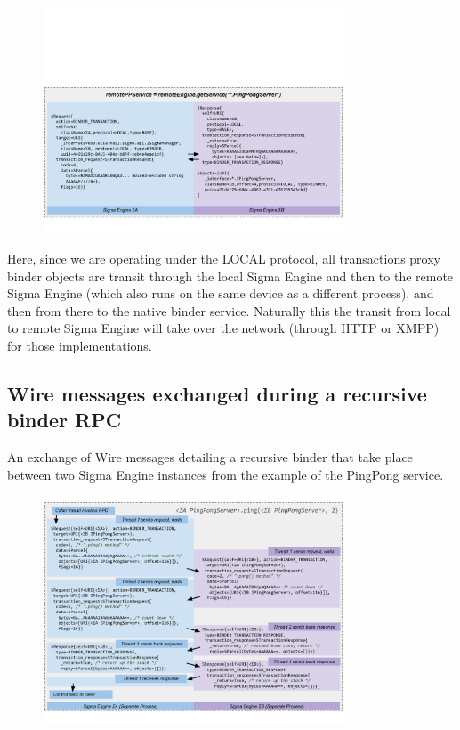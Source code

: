 \documentclass[prodmode]{acmlarge}
\begin{document}
\begin{figure}[h!]
\centering
\includegraphics[width=0.8\textwidth]{drawings/WireExchange2.pdf}
\end{figure}

Here, since we are operating under the LOCAL protocol, all transactions proxy binder objects are transit through the local Sigma Engine and then to the remote Sigma Engine (which also runs on the same device as a different process), and then from there to the native binder service. Naturally this the transit from local to remote Sigma Engine will take over the network (through HTTP or XMPP) for those implementations.

\pagebreak[4]
\subsection{Wire messages exchanged during a recursive binder RPC}
\label{app:WireExchangeRecursive}
An exchange of Wire messages detailing a recursive binder that take place between two Sigma Engine instances from the example of the PingPong service.
\begin{figure}[h!]
\centering
\includegraphics[width=0.8\textwidth]{drawings/WireExchangeRecursive.pdf}
\end{figure}
\pagebreak[4]

\begingroup
\raggedright
\footnotesize

\endgroup
\end{document}
